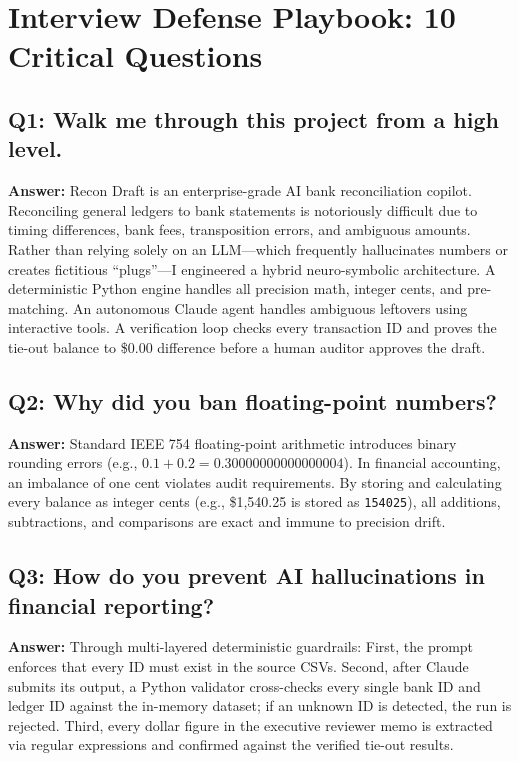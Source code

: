 \documentclass[10pt,a4paper]{article}
\begin{document}
\section{Interview Defense Playbook: 10 Critical Questions}

\subsection{Q1: Walk me through this project from a high level.}
\textbf{Answer:} Recon Draft is an enterprise-grade AI bank reconciliation copilot. Reconciling general ledgers to bank statements is notoriously difficult due to timing differences, bank fees, transposition errors, and ambiguous amounts. Rather than relying solely on an LLM—which frequently hallucinates numbers or creates fictitious ``plugs''—I engineered a hybrid neuro-symbolic architecture. A deterministic Python engine handles all precision math, integer cents, and pre-matching. An autonomous Claude agent handles ambiguous leftovers using interactive tools. A verification loop checks every transaction ID and proves the tie-out balance to \$0.00 difference before a human auditor approves the draft.

\subsection{Q2: Why did you ban floating-point numbers?}
\textbf{Answer:} Standard IEEE 754 floating-point arithmetic introduces binary rounding errors (e.g., $0.1 + 0.2 = 0.30000000000000004$). In financial accounting, an imbalance of one cent violates audit requirements. By storing and calculating every balance as integer cents (e.g., \$1,540.25 is stored as \texttt{154025}), all additions, subtractions, and comparisons are exact and immune to precision drift.

\subsection{Q3: How do you prevent AI hallucinations in financial reporting?}
\textbf{Answer:} Through multi-layered deterministic guardrails:
First, the prompt enforces that every ID must exist in the source CSVs. Second, after Claude submits its output, a Python validator cross-checks every single bank ID and ledger ID against the in-memory dataset; if an unknown ID is detected, the run is rejected. Third, every dollar figure in the executive reviewer memo is extracted via regular expressions and confirmed against the verified tie-out results.
\end{document}

